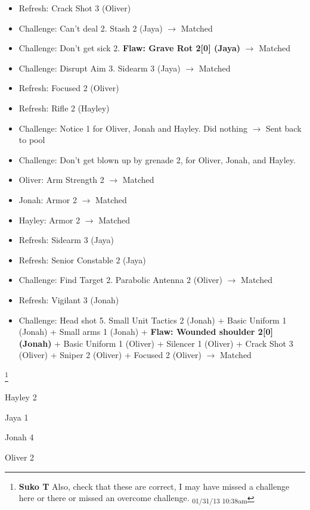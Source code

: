{\begin{itemize}
\item Refresh: Crack Shot 3 (Oliver)
\item Challenge: Can't deal 2.  Stash 2 (Jaya) $\rightarrow$ Matched
\item Challenge: Don't get sick 2. \textbf{ {\color[RGB]{255,0,0}Flaw: Grave Rot 2{[}0{]} (Jaya)} } $\rightarrow$ Matched
\item Challenge: Disrupt Aim 3. Sidearm 3 (Jaya) $\rightarrow$ Matched
\item Refresh: Focused 2 (Oliver)
\item Refresh: Rifle 2 (Hayley)
\item Challenge: Notice 1 for Oliver, Jonah and Hayley. Did nothing $\rightarrow$ Sent back to pool
\item Challenge: Don't get blown up by grenade 2, for Oliver, Jonah, and Hayley.  
\end{itemize}

\begin{itemize}
\item Oliver: Arm Strength 2 $\rightarrow$ Matched
\item Jonah: Armor 2 $\rightarrow$ Matched
\item Hayley: Armor 2 $\rightarrow$ Matched
\end{itemize}

\begin{itemize}
\item Refresh: Sidearm 3 (Jaya)
\item Refresh: Senior Constable 2 (Jaya)
\item Challenge: Find Target 2.  Parabolic Antenna 2 (Oliver) $\rightarrow$ Matched
\item Refresh: Vigilant 3 (Jonah)
\item Challenge: Head shot 5.  Small Unit Tactics 2 (Jonah) + Basic Uniform 1 (Jonah) + Small arms 1 (Jonah) + \textbf{ {\color[RGB]{255,0,0}Flaw: Wounded shoulder 2{[}0{]} (Jonah)} } + Basic Uniform 1 (Oliver) + Silencer 1 (Oliver) + Crack Shot 3 (Oliver) + Sniper 2 (Oliver) + Focused 2 (Oliver) $\rightarrow$ Matched
\end{itemize}

}



 \footnote{\textbf{Suko T }Also, check that these are correct, I may have missed a challenge here or there or missed an overcome challenge. \textsubscript{01/31/13 10:38am}}

{
\parskip=0pt
Hayley 2

Jaya 1

Jonah 4

Oliver 2
}
\newpage




